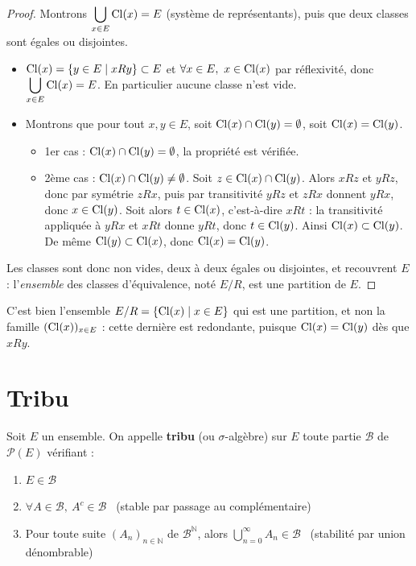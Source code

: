\begin{proof}
Montrons $\displaystyle\bigcup_{x\in E} \operatorname{Cl}(x) = E$ (système de représentants), puis que deux classes sont égales ou disjointes.

\begin{itemize}
\item $\operatorname{Cl}(x) = \{y\in E \mid xRy\}\subset E$ et $\forall x\in E,\ x\in \operatorname{Cl}(x)$ par réflexivité, donc $\displaystyle\bigcup_{x\in E} \operatorname{Cl}(x) = E$. En particulier aucune classe n'est vide.
\item Montrons que pour tout $x,y\in E$, soit $\operatorname{Cl}(x)\cap \operatorname{Cl}(y)=\emptyset$, soit $\operatorname{Cl}(x)=\operatorname{Cl}(y)$.
\begin{itemize}
\item 1er cas : $\operatorname{Cl}(x)\cap \operatorname{Cl}(y)=\emptyset$, la propriété est vérifiée.
\item 2ème cas : $\operatorname{Cl}(x)\cap \operatorname{Cl}(y)\neq\emptyset$. Soit $z\in \operatorname{Cl}(x)\cap \operatorname{Cl}(y)$. Alors $xRz$ et $yRz$, donc par symétrie $zRx$, puis par transitivité $yRz$ et $zRx$ donnent $yRx$, donc $x\in \operatorname{Cl}(y)$. Soit alors $t\in \operatorname{Cl}(x)$, c'est-à-dire $xRt$ : la transitivité appliquée à $yRx$ et $xRt$ donne $yRt$, donc $t\in \operatorname{Cl}(y)$. Ainsi $\operatorname{Cl}(x)\subset \operatorname{Cl}(y)$. De même $\operatorname{Cl}(y)\subset \operatorname{Cl}(x)$, donc $\operatorname{Cl}(x)=\operatorname{Cl}(y)$.
\end{itemize}
\end{itemize}
Les classes sont donc non vides, deux à deux égales ou disjointes, et recouvrent $E$ : l'\emph{ensemble} des classes d'équivalence, noté $E/R$, est une partition de $E$.
\end{proof}

\begin{remarque}
C'est bien l'ensemble $E/R = \{\operatorname{Cl}(x) \mid x\in E\}$ qui est une partition, et non la famille $(\operatorname{Cl}(x))_{x\in E}$ : cette dernière est redondante, puisque $\operatorname{Cl}(x)=\operatorname{Cl}(y)$ dès que $xRy$.
\end{remarque}

\section{Tribu}

\begin{defi}[Tribu]
\label{defi:tribu}
Soit $E$ un ensemble. On appelle \textbf{tribu} (ou $\sigma$-algèbre) sur $E$ toute partie $\mathcal{B}$ de $\mathcal{P}(E)$ vérifiant :
\begin{enumerate}
\item[(1)] $E\in\mathcal{B}$
\item[(2)] $\forall A\in\mathcal{B},\ A^c\in\mathcal{B}$ \ (stable par passage au complémentaire)
\item[(3)] Pour toute suite $(A_n)_{n\in\mathbb{N}}$ de $\mathcal{B}^{\mathbb{N}}$, alors $\displaystyle\bigcup_{n=0}^{\infty} A_n \in \mathcal{B}$ \ (stabilité par union dénombrable)
\end{enumerate}
\end{defi}


